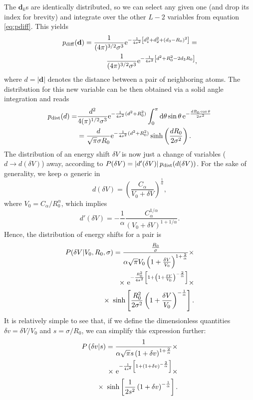 \documentclass[prl,aps,twocolumn,showpacs,superscriptaddress,longbibliography]{revtex4-1}
\newcommand{\be}{\begin{equation}}
\newcommand{\ee}{\end{equation}}
\newcommand{\rmd}{{\rm{d}}}
\newcommand{\rme}[1]{{\rm{e}}^{#1}}
\newcommand{\lt}{\left(}
\newcommand{\rt}{\right)}
\newcommand{\lqq}{\left[}
\newcommand{\rqq}{\right]}
\newcommand{\abs}[1]{\left| #1 \right|}
\begin{document}
The $\mathbf{d}_k$s are identically distributed, so we can select any given one (and drop its index for brevity) and integrate over the other $L-2$ variables from equation \eqref{eq:pdiff}. This yields
\be
\begin{split}
	p_{\rm diff} (\mathbf{d}) = \frac{1}{(4\pi)^{3/2} \sigma^3 } \rme{-\frac{1}{4 \sigma^2}  \lqq d_1^2   +d_2^2 + (d_3 - R_0)^2  \rqq         } = \\
	\frac{1}{(4\pi)^{3/2} \sigma^3 } \rme{-\frac{1}{4 \sigma^2}  \lqq d^2 + R_0^2 - 2 d_3 R_0  \rqq         },
	\label{eq:distr_simpl}
\end{split}
\ee
where $d = \abs{\mathbf{d}}$ denotes the distance between a pair of neighboring atoms. The distribution for this new variable can be then obtained via a solid angle integration and reads 
\be	
\begin{split}
	p_{\rm dist} (d) = & \frac{d^2}{4(\pi)^{1/2} \sigma^3}  \rme{- \frac{1}{4\sigma^2} (d^2 + R_0^2) }  \int_0^\pi \rmd \theta   \sin\theta \,  \rme{-\frac{d R_0 \cos\theta }{2\sigma^2}}   \\
	&= \frac{d}{\sqrt{\pi} \sigma R_0}  \rme{- \frac{1}{4\sigma^2} (d^2 + R_0^2) } \sinh \lt \frac{d R_0}{2\sigma^2} \rt.
\end{split}
\ee
The distribution of an energy shift $\delta V$ is now just a change of variables ($d \to d(\delta V)$) away, according to $P(\delta V) = \abs{d'(\delta V)} p_{\rm dist} (d(\delta V))$.
For the sake of generality, we keep $\alpha$ generic in 
\be
	d(\delta V) = \lt \frac{C_\alpha}{V_0 + \delta V} \rt^\frac{1}{\alpha},
\ee
where $V_0 = C_\alpha / R_0^\alpha$, which implies
\be
	d'(\delta V) = -\frac{1}{\alpha} \frac{C_\alpha^{1/\alpha}}{(V_0 + \delta V)^{1+1/\alpha}}.
\ee
Hence, the distribution of energy shifts for a pair is
\be
\begin{split}
	P (\delta V | V_0, R_0, \sigma) = \frac{\frac{R_0}{\sigma} }{\alpha \sqrt{\pi} V_0 \lt 1 + \frac{\delta V}{V_0}  \rt^{1 + \frac{2}{\alpha}}} \times \\
	 \times \ \rme{-\frac{R_0^2}{4\sigma^2}  \lqq   1 + \lt 1 + \frac{\delta V}{V_0}  \rt^{-\frac{2}{\alpha}} \rqq} \times \\
	 \times \ \sinh \lqq \frac{R_0^2}{2\sigma^2}  \lt 1 + \frac{\delta V}{V_0}  \rt^{-\frac{1}{\alpha}}  \rqq.
\end{split}
\ee
It is relatively simple to see that, if we define the dimensionless quantities $\delta v = \delta V / V_0$ and $s = \sigma/R_0$, we can simplify this expression further:
\be
\begin{split}
	P \lt \delta v | s \rt = \frac{1 }{\alpha \sqrt{\pi} s \lt 1 + \delta v  \rt^{1 + \frac{2}{\alpha}}} \times \\
	 \times \ \rme{-\frac{1}{4s^2}  \lqq   1 + \lt 1 + \delta v \rt^{-\frac{2}{\alpha}} \rqq} \times \\
	 \times \ \sinh \lqq \frac{1}{2s^2}  \lt 1 + \delta v  \rt^{-\frac{1}{\alpha}}  \rqq.
\label{eq:simpl}
\end{split}
\ee
\end{document}

